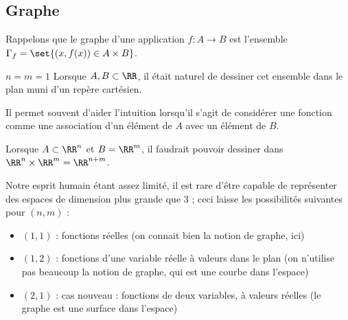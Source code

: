 
\subsection{Graphe}

\begin{frame}
  \begin{definition}
    Rappelons que le graphe d'une application \(f : A \to B\) est l'ensemble \(\Gamma_{f} = \set{ (x,f(x)) \in A \times B }\).
  \end{definition}
  \begin{block}{$n=m=1$}
    Lorsque \(A,B\subset \RR\), il était naturel de dessiner cet ensemble dans le plan muni d'un repère cartésien.

    Il permet souvent d'aider l'intuition lorsqu'il s'agit de considérer une fonction comme une association d'un élément de \(A\) avec un élément de \(B\).
  \end{block}
\end{frame}
\begin{frame}
  \begin{block}{}
    Lorsque \(A \subset \RR^{n}\) et \(B = \RR^{m}\), il faudrait pouvoir \og dessiner\fg{} dans \(\RR^{n}\times\RR^{m} =\RR^{n+m}\).\pause{}

    Notre esprit humain étant assez limité, il est rare d'être capable de représenter des espaces de dimension plus grande que \(3\)\pause{} ; ceci laisse les possibilités suivantes pour \((n,m)\) :\pause{}
    \begin{itemize}
    \item \((1,1)\) : fonctions réelles\pause{} (on connait bien la notion de graphe, ici)\pause{}
    \item \((1,2)\) : fonctions d'une variable réelle à valeurs dans le plan\pause{} (on n'utilise pas beaucoup la notion de graphe, qui est une courbe dans l'espace)\pause{}
    \item \((2,1)\) : cas nouveau : fonctions de deux variables, à valeurs réelles\pause{} (le graphe est une surface dans l'espace)\pause{}
    \end{itemize}
  \end{block}
\end{frame}

